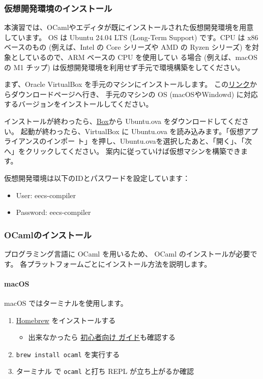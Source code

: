 \documentclass[a4paper,11pt]{jsarticle}
\begin{document}
\subsubsection{仮想開発環境のインストール}
\label{sec:virtual_machine}

本演習では、OCamlやエディタが既にインストールされた仮想開発環境を用意しています。
OS は Ubuntu 24.04 LTS (Long-Term Support) です。CPU は x86 ベースのもの (例えば、Intel の
Core シリーズや AMD の Ryzen シリーズ) を対象としているので、ARM ベースの CPU を使用してい
る場合 (例えば、macOS の M1 チップ) は仮想開発環境を利用せず手元で環境構築をしてください。

まず、Oracle VirtualBox を手元のマシンにインストールします。
この\href{https://www.virtualbox.org/wiki/Downloads}{リンク}からダウンロードページへ行き、
手元のマシンの OS (macOSやWindowd) に対応するバージョンをインストールしてください。

インストールが終わったら、\href{https://tmpuc.box.com/s/2b8nzqw2vhx047a488m26h1whn8wfdfz}{Box}から
Ubuntu.ova をダウンロードしてください。
起動が終わったら、VirtualBox に Ubuntu.ova を読み込みます。「仮想アプライアンスのインポー
ト」を押し、Ubuntu.ovaを選択したあと、「開く」、「次へ」をクリックしてください。
案内に従っていけば仮想マシンを構築できます。

仮想開発環境は以下のIDとパスワードを設定しています：

\begin{itemize}
\item User: eecs-compiler
\item Password: eecs-compiler
\end{itemize}

\subsubsection{OCamlのインストール}

プログラミング言語に OCaml を用いるため、 OCaml のインストールが必要です。
各プラットフォームごとにインストール方法を説明します。

\paragraph{macOS}

macOS ではターミナルを使用します。

\begin{enumerate}
\item \href{https://brew.sh/ja}{Homebrew} をインストールする
  \begin{itemize}
  \item 出来なかったら \href{https://zenn.dev/inablog/articles/5e790c9fbdad20}{初心者向け
      ガイド}も確認する
  \end{itemize}
\item \verb|brew install ocaml| を実行する
\item ターミナル で \verb|ocaml| と打ち REPL が立ち上がるか確認
\end{enumerate}
\end{document}
